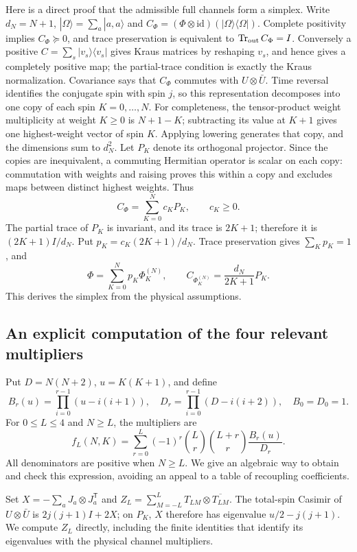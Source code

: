 \documentclass[11pt,a4paper]{article}
\begin{document}
Here is a direct proof that the admissible full channels form a simplex.
Write $d_N=N+1$, $|\Omega\rangle=\sum_a|a,a\rangle$ and
$C_\Phi=(\Phi\otimes\mathrm{id})(|\Omega\rangle\langle\Omega|)$.
Complete positivity implies $C_\Phi\succeq0$, and trace preservation
is equivalent to $\operatorname{Tr}_{\rm out}C_\Phi=I$.
Conversely a positive $C=\sum_s|v_s\rangle\langle v_s|$ gives Kraus
matrices by reshaping $v_s$, and hence gives a completely positive map;
the partial-trace condition is exactly the Kraus normalization.
Covariance says that $C_\Phi$ commutes with $U\otimes\bar U$.
Time reversal identifies the conjugate spin with spin $j$, so this
representation decomposes into one copy of each spin $K=0,\ldots,N$.
For completeness, the tensor-product weight multiplicity at weight
$K\ge0$ is $N+1-K$; subtracting its value at $K+1$ gives one
highest-weight vector of spin $K$. Applying lowering generates that
copy, and the dimensions sum to $d_N^2$.
Let $P_K$ denote its orthogonal projector. Since the copies are
inequivalent, a commuting Hermitian operator is scalar on each copy:
commutation with weights and raising proves this within a copy and
excludes maps between distinct highest weights. Thus
\[
 C_\Phi=\sum_{K=0}^N c_KP_K,\qquad c_K\ge0.
\]
The partial trace of $P_K$ is invariant, and its trace is $2K+1$;
therefore it is $(2K+1)I/d_N$. Put
$p_K=c_K(2K+1)/d_N$. Trace preservation gives $\sum_Kp_K=1$, and
\begin{equation}\label{eq:channel-simplex}
 \Phi=\sum_{K=0}^Np_K\Phi_K^{(N)},\qquad
 C_{\Phi_K^{(N)}}=\frac{d_N}{2K+1}P_K.
\end{equation}
This derives the simplex from the physical assumptions.

\subsection{An explicit computation of the four relevant multipliers}
Put $D=N(N+2)$, $u=K(K+1)$, and define
\[
 B_r(u)=\prod_{i=0}^{r-1}(u-i(i+1)),\quad
 D_r=\prod_{i=0}^{r-1}(D-i(i+2)),\quad B_0=D_0=1.
\]
For $0\le L\le4$ and $N\ge L$, the multipliers are
\begin{equation}\label{eq:racah-derived}
 f_L(N,K)=\sum_{r=0}^L(-1)^r\binom Lr\binom{L+r}r\frac{B_r(u)}{D_r}.
\end{equation}
All denominators are positive when $N\ge L$. We give an algebraic way to
obtain and check this expression, avoiding an appeal to a table of
recoupling coefficients.

Set $X=-\sum_aJ_a\otimes J_a^{\mathsf T}$ and
$Z_L=\sum_{M=-L}^LT_{LM}\otimes\overline{T_{LM}}$.
The total-spin Casimir of $U\otimes\bar U$ is $2j(j+1)I+2X$;
on $P_K$, $X$ therefore has eigenvalue $u/2-j(j+1)$.
We compute $Z_L$ directly, including the finite identities that identify
its eigenvalues with the physical channel multipliers.
\end{document}
